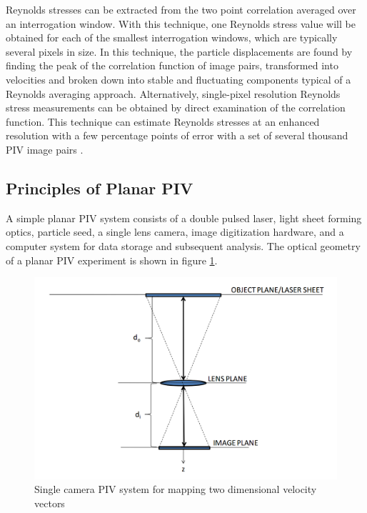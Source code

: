 Reynolds stresses can be extracted from the two point correlation averaged over 
an interrogation window. With this technique, one Reynolds stress value will be 
obtained for each of the smallest interrogation windows, which are typically 
several pixels in size. In this technique, the particle displacements are found 
by finding the peak of the correlation function of image pairs, transformed 
into velocities and broken down into stable and fluctuating components typical 
of a Reynolds averaging approach. Alternatively, single-pixel resolution 
Reynolds stress measurements can be obtained by direct examination of the 
correlation function. This technique can estimate Reynolds stresses at an 
enhanced resolution with a few percentage points of error with a set of several 
thousand PIV image pairs \cite{scharnowski2011}.

\subsection{Principles of Planar PIV}

A simple planar PIV system consists of a double pulsed laser, light sheet 
forming optics, particle seed, a single lens camera, image digitization 
hardware, and a computer system for data storage and subsequent analysis. The 
optical geometry of a planar PIV experiment is shown in figure 
\ref{fig:mono_piv}.

\begin{figure}[H]
	\centering
	\includegraphics[width=5in]{figs/piv_method/mono_piv_optics}
	\caption{Single camera PIV system for mapping two dimensional velocity 
		vectors}
	\label{fig:mono_piv}
\end{figure} 

